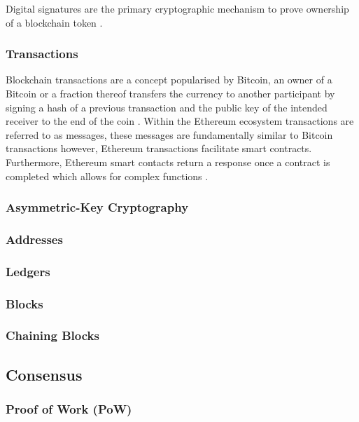 Digital signatures are the primary cryptographic mechanism to prove ownership of a blockchain token \autocite{nakamotoBitcoinPeertoPeerElectronic2008}. 

\subsubsection{Transactions}

Blockchain transactions are a concept popularised by Bitcoin, an owner of a Bitcoin or a fraction thereof transfers the currency to another participant by signing a hash of a previous transaction and the public key of the intended receiver to the end of the coin \autocite{nakamotoBitcoinPeertoPeerElectronic2008}. Within the Ethereum ecosystem transactions are referred to as messages, these messages are fundamentally similar to Bitcoin transactions however, Ethereum transactions facilitate smart contracts. Furthermore, Ethereum smart contacts return a response once a contract is completed which allows for complex functions \autocite{vitalikEthereumWhitepaper2014}. 

\subsubsection{Asymmetric-Key Cryptography}

\subsubsection{Addresses}

\subsubsection{Ledgers}

\subsubsection{Blocks}

\subsubsection{Chaining Blocks}

\subsection{Consensus}

\subsubsection{Proof of Work (PoW)}

